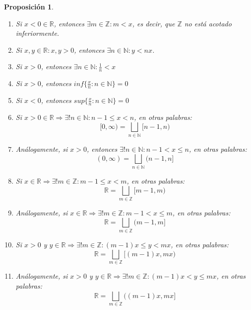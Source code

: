 \documentclass[10pt,a4paper,openright]{book}
\theoremstyle{break}
\newtheorem{prop}{Proposición}[chapter]
\begin{document}
\begin{prop}
\begin{enumerate}
\item Si $x<0\in \mathbb R$, entonces $\exists m\in \mathbb Z: m<x$, es decir, que $\mathbb Z$ no está acotado inferiormente.
\item Si $x,y\in \mathbb R: x,y>0$, entonces $\exists n \in \mathbb N : y<nx$.
\item Si $x>0$, entonces $\exists n \in \mathbb N : \frac{1}{n}<x$
\item Si $x>0$, entonces $inf\{\frac{x}{n}: n\in \mathbb N\}=0$
\item Si $x<0$, entonces $sup\{\frac{x}{n}: n\in \mathbb N\}=0$
\item Si $x>0\in \mathbb R\Rightarrow \exists! n \in \mathbb N: n-1\leq x< n$, en otras palabras:
$$[0,\infty)=\bigsqcup_{n\in \mathbb N}[n-1,n)$$
\item Análogamente, si $x>0$, entonces $\exists! n \in \mathbb N: n-1< x\leq n$, en otras palabras:
$$(0,\infty)=\bigsqcup_{n\in \mathbb N}(n-1,n]$$
\item Si $x\in \mathbb R\Rightarrow \exists! m \in \mathbb Z: m-1\leq x < m$, en otras palabras:
$$\mathbb R =\bigsqcup_{m\in \mathbb Z}[m-1,m)$$
\item Análogamente, si $x\in \mathbb R\Rightarrow \exists! m \in \mathbb Z: m-1< x\leq m$, en otras palabras:
$$\mathbb R =\bigsqcup_{m\in \mathbb Z}(m-1,m]$$
\item Si $x>0$ y $y\in \mathbb R\Rightarrow \exists! m \in \mathbb Z: (m-1)x\leq y <mx$, en otras palabras:
$$\mathbb R= \bigsqcup_{m\in \mathbb Z}[(m-1)x, mx)$$
\item Análogamente, si $x>0$ y $y\in \mathbb R\Rightarrow \exists! m \in \mathbb Z: (m-1)x< y \leq mx$, en otras palabras:
$$\mathbb R= \bigsqcup_{m\in \mathbb Z}((m-1)x, mx]$$
\end{enumerate}
\end{prop}
\end{document}
